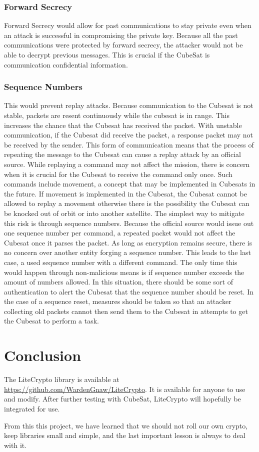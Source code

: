 \documentclass[12pt]{article}
\begin{document}
\begin{multicols}{2}
\subsubsection{Forward Secrecy}
Forward Secrecy would allow for past communications to stay private even when an attack is successful in compromising the private key. Because all the past communications were protected by forward secrecy, the attacker would not be able to decrypt previous messages. This is crucial if the CubeSat is communication confidential information.
\subsubsection{Sequence Numbers}
This would prevent replay attacks. Because communication to the Cubesat is not stable, packets are resent continuously while the cubesat is in range. This increases the chance that the Cubesat has received the packet. With unstable communication, if the Cubesat did receive the packet, a response packet may not be received by the sender. This form of communication means that the process of repeating the message to the Cubesat can cause a replay attack by an official source. While replaying a command may not affect the mission, there is concern when it is crucial for the Cubesat to receive the command only once. Such commands include movement, a concept that may be implemented in Cubesats in the future. If movement is implemented in the Cubesat, the Cubesat cannot be allowed to replay a movement otherwise there is the possibility the Cubesat can be knocked out of orbit or into another satellite. The simplest way to mitigate this risk is through sequence numbers. Because the official source would issue out one sequence number per command, a repeated packet would not affect the Cubesat once it parses the packet. As long as encryption remains secure, there is no concern over another entity forging a sequence number. This leads to the last case, a used sequence number with a different command. The only time this would happen through non-malicious means is if sequence number exceeds the amount of numbers allowed. In this situation, there should be some sort of authentication to alert the Cubesat that the sequence number should be reset. In the case of a sequence reset, measures should be taken so that an attacker collecting old packets cannot then send them to the Cubesat in attempts to get the Cubesat to perform a task.
\section{Conclusion}
The LiteCrypto library is available at \url{https://github.com/WardenGnaw/LiteCrypto}. It is available for anyone to use and modify. After further testing with CubeSat, LiteCrypto will hopefully be integrated for use.

From this this project, we have learned that we should not roll our own crypto,  keep libraries small and simple, and the last important lesson is always to deal with it.
\end{multicols}
\clearpage
\nocite{*}
\def\UrlBreaks{\do\/\do-}




\end{document}
